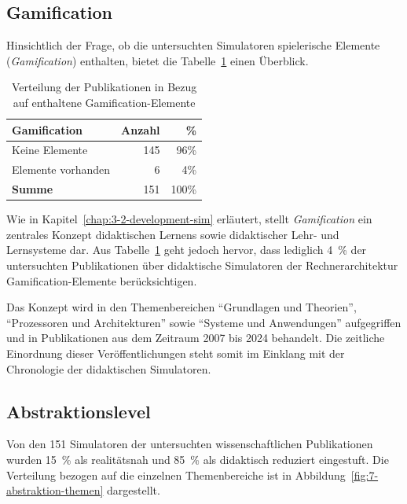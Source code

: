 \subsection{Gamification}

Hinsichtlich der Frage, ob die untersuchten Simulatoren spielerische Elemente (\textit{Gamification}) enthalten, bietet die Tabelle~\ref{tab:gamification} einen Überblick.

\begin{table}[!htbp]
    \centering
    \begin{tabular}{l r r}
        \hline
        \textbf{Gamification} & \textbf{Anzahl} & \textbf{\%} \\
        \hline
        Keine Elemente     & 145 & 96\% \\
        Elemente vorhanden & 6   & 4\%  \\
        \hline
        \textbf{Summe}     & 151 & 100\% \\
        \hline
    \end{tabular}
    \caption{Verteilung der Publikationen in Bezug auf enthaltene Gamification-Elemente}
    \label{tab:gamification}
\end{table}

Wie in Kapitel~\ref{chap:3-2-development-sim} erläutert, stellt \textit{Gamification} ein zentrales Konzept didaktischen Lernens sowie didaktischer Lehr- und Lernsysteme dar. Aus Tabelle~\ref{tab:gamification} geht jedoch hervor, dass lediglich 4~\% der untersuchten Publikationen über didaktische Simulatoren der Rechnerarchitektur Gamification-Elemente berücksichtigen.

Das Konzept wird in den Themenbereichen \enquote{Grundlagen und Theorien}, \enquote{Prozessoren und Architekturen} sowie \enquote{Systeme und Anwendungen} aufgegriffen und in Publikationen aus dem Zeitraum 2007 bis 2024 behandelt. Die zeitliche Einordnung dieser Veröffentlichungen steht somit im Einklang mit der Chronologie der didaktischen Simulatoren.

\subsection{Abstraktionslevel}

Von den 151 Simulatoren der untersuchten wissenschaftlichen Publikationen wurden 15~\% als realitätsnah und 85~\% als didaktisch reduziert eingestuft. Die Verteilung bezogen auf die einzelnen Themenbereiche ist in Abbildung~\ref{fig:7-abstraktion-themen} dargestellt.

